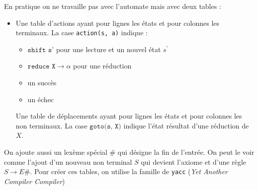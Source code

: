 \documentclass{cours}
\begin{document}
En pratique on ne travaille pas avec l'automate mais avec deux tables : 
\begin{itemize}
    \item Une table d'actions ayant pour lignes les états et pour colonnes les terminaux. La case \texttt{action(s, a)} indique : 
    \begin{itemize}
        \item $\texttt{shift s'}$ pour une lecture et un nouvel état $s^{'}$
        \item $\texttt{reduce X} \rightarrow \alpha$ pour une réduction
        \item un succès
        \item un échec
    \end{itemize}
    Une table de déplacements ayant pour lignes les états et pour colonnes les non terminaux. La case $\texttt{goto(s, X)}$ indique l'état résultat d'une réduction de $X$.
\end{itemize}
On ajoute aussi un lexème spécial \# qui désigne la fin de l'entrée. On peut le voir comme l'ajout d'un nouveau non terminal $S$ qui devient l'axiome et d'une règle $S \rightarrow E \#$.
Pour créer ces tables, on utilise la famille de \texttt{yacc} (\textit{Yet Another Compiler Compiler})
\end{document}
